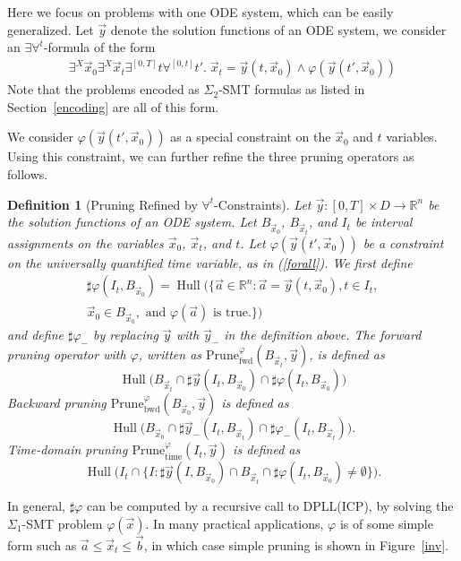 \documentclass[12pt]{article}
\newtheorem{definition}[theorem]{Definition}
\DeclareMathOperator{\Hull}{Hull}
\begin{document}
Here we focus on problems with one ODE system, which can be easily generalized. Let $\vec y$ denote the solution functions of an ODE system, we consider an $\exists\forall^t$-formula of the form
\begin{eqnarray}\label{forall}
\exists^X \vec x_0\exists^X \vec x_t\exists^{[0,T]} t \forall^{[0,t]} t'.\; \vec x_t = \vec y(t, \vec x_0)\wedge \varphi(\vec y (t', \vec x_0))
\end{eqnarray}
Note that the problems encoded as $\Sigma_2$-SMT formulas as listed in Section~\ref{encoding} are all of this form.

We consider $\varphi(\vec y(t', \vec x_0))$ as a special constraint on the $\vec x_0$ and $t$ variables. Using this constraint, we can further refine the three pruning operators as follows.
\begin{definition}[Pruning Refined by $\forall^t$-Constraints]
Let $\vec y:[0,T]\times D\rightarrow \mathbb{R}^n$ be the solution functions of an ODE system. Let $B_{\vec x_0}$, $B_{\vec x_t}$, and $I_{t}$ be interval assignments on the variables $\vec x_0$, $\vec x_t$, and $t$. Let $\varphi(\vec y(t', \vec x_0))$ be a constraint on the universally quantified time variable, as in (\ref{forall}).
We first define
\begin{multline*}\sharp\varphi(I_t, B_{\vec x_0})=\Hull(\{\vec a\in \mathbb{R}^n: \vec a = \vec y(t, \vec x_0), t\in I_t,\\ \vec x_0\in B_{\vec x_0},\mbox{ and }\varphi(\vec a)\mbox{ is true.}\})
\end{multline*}
and define $\sharp\varphi_-$ by replacing $\vec y$ with $\vec y_-$ in the definition above. The forward pruning operator with $\varphi$, written as $\mathrm{Prune}_{\mathrm{fwd}}^{\varphi}(B_{\vec x_t}, \vec y)$, is defined as
$$\Hull\Big(B_{\vec x_t}\cap \sharp \vec y(I_t, B_{\vec x_0})\cap\sharp\varphi(I_t,B_{\vec x_0})\Big)$$
Backward pruning $\mathrm{Prune}^{\varphi}_{\mathrm{bwd}}(B_{\vec x_0}, \vec y)$ is defined as
$$\Hull\Big(B_{\vec x_0}\cap \sharp \vec y_-(I_t, B_{\vec x_t})\cap\sharp\varphi_-(I_t,B_{\vec x_t})\Big).$$
Time-domain pruning $\mathrm{Prune}_{\mathrm{time}}^{\varphi}(I_{t}, \vec y)$ is defined as
$$\Hull\Big(I_{t}\cap \{I : \sharp \vec y(I, B_{\vec x_0})\cap  B_{\vec x_t}\cap\sharp\varphi(I_t,B_{\vec x_0}) \not= \emptyset\}\Big).$$
\end{definition}
In general, $\sharp \varphi$ can be computed by a recursive call to DPLL(ICP), by solving the $\Sigma_1$-SMT problem $\varphi(\vec x)$. In many practical applications, $\varphi$ is of some simple form such as $\vec a\leq \vec x_t\leq \vec b$, in which case simple pruning is shown in Figure~\ref{inv}.
\end{document}
